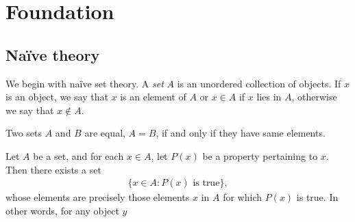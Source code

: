 
\chapter{Foundation}

\section{Na\"ive theory}

We begin with na\"ive set theory. A \emph{set} $A$ is an unordered collection of objects. If $x$ is an object, we say that $x$ is an element of $A$ or $x \in A$ if $x$ lies in $A$, otherwise we say that $x \notin A$.

\begin{axiom}[Extension]
    Two sets $A$ and $B$ are equal, $A = B$, if and only if they have same elements.
\end{axiom}

\begin{axiom}
    Let $A$ be a set, and for each $x \in A$, let $P(x)$ be a property pertaining to $x$. Then there exists a set 
    \begin{align*}
        \{x ∈ A : P(x) \text{ is true}\},
    \end{align*}
    whose elements are precisely those elements $x$ in $A$ for which $P(x)$ is true. In other words, for any object $y$
\end{axiom}



